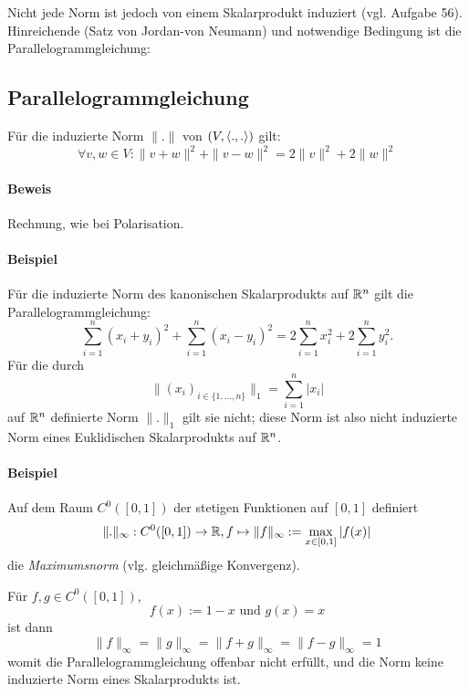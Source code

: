 	Nicht jede Norm ist jedoch von einem Skalarprodukt induziert (vgl. Aufgabe 56).
	Hinreichende (Satz von Jordan-von Neumann) und notwendige Bedingung ist die Parallelogrammgleichung:
	
\subsection{Parallelogrammgleichung}
\begin{Satz}[Parallelogrammgleichung]
	Für die induzierte Norm $ \|.\| $ von $ (V,\langle .,. \rangle) $ gilt:
		\[ \forall v,w\in V: \|v+w\|^2+\|v-w\|^2=2\|v\|^2+2\|w\|^2 \]
\end{Satz}		

 	\begin{figure}[H]\centering
 		
	\end{figure}
		
\paragraph{Beweis}
	Rechnung, wie bei Polarisation.
\paragraph{Beispiel}
	Für die induzierte Norm des kanonischen Skalarprodukts auf $ \mathbb{R}^n $ gilt die Parallelogrammgleichung:
		\[ \sum_{i=1}^{n}(x_i+y_i)^2 + \sum_{i=1}^{n}(x_i-y_i)^2 = 2\sum_{i=1}^{n}x_i^2+2\sum_{i=1}^{n}y_i^2. \]
	Für die durch
		\[ \|(x_i)_{i\in \{1,\dots,n\}}\|_1 = \sum_{i=1}^{n}|x_i| \]
	auf $ \mathbb{R}^n $ definierte Norm $ \|.\|_1 $ gilt sie nicht; diese Norm ist also nicht induzierte Norm eines Euklidischen Skalarprodukts auf $ \mathbb{R}^n $.
\paragraph{Beispiel}
	Auf dem Raum $ C^0([0,1]) $ der stetigen Funktionen auf $ [0,1] $ definiert
		\[ \|.\|_\infty: C^0([0,1]) \to \mathbb{R}, f\mapsto \|f\|_\infty := \max_{x\in [0,1]}|f(x)| \]
	die \emph{Maximumsnorm} (vlg. gleichmäßige Konvergenz).
	
	Für $ f,g\in C^0([0,1]) $,
		\[ f(x):= 1-x \text{ und } g(x) = x \]
	ist dann
		\[ \|f\|_\infty = \|g\|_\infty = \|f+g\|_\infty = \|f-g\|_\infty = 1 \]
	womit die Parallelogrammgleichung offenbar nicht erfüllt, und die Norm keine induzierte Norm eines Skalarprodukts ist.